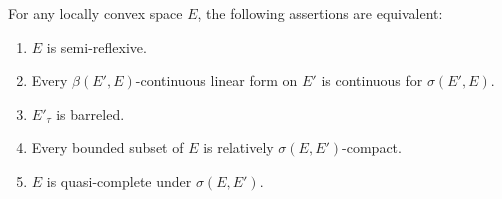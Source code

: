 For any locally convex space $E$, the following assertions are equivalent:
\begin{enumerate}
\item[(a)] $E$ is semi-reflexive.
\item[(b)] Every $\beta(E', E)$-continuous linear form on $E'$ is continuous for $\sigma(E', E)$.
\item[(c)] $E'_\tau$ is barreled.
\item[(d)] Every bounded subset of $E$ is relatively $\sigma(E, E')$-compact.
\item[(e)] $E$ is quasi-complete under $\sigma(E, E')$.
\end{enumerate}
